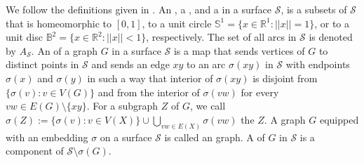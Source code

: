 We follow the definitions given in \citet[Appendix~B]{diestel:graph}. An , a , and a  in a surface $\mathcal{S}$, is a subsets of $\mathcal{S}$ that is homeomorphic to $[0, 1]$, to a unit circle $\mathbb{S}^1 = \{x \in \mathbb{R}^1: ||x|| = 1\}$, or to a unit disc $\mathbb{B}^2 = \{x \in \mathbb{R}^2 : ||x|| < 1\}$, respectively.
The set of all arcs in $\mathcal{S}$ is denoted by $A_\mathcal{S}$.
An  of a graph $G$ in a surface $\mathcal{S}$ is a map  that sends vertices of $G$ to distinct points in $\mathcal{S}$ and sends an edge $xy$ to
an arc $\sigma(xy)$ in $\mathcal{S}$ with endpoints $\sigma(x)$ and $\sigma(y)$ in such a way that interior of $\sigma(xy)$ is disjoint from $\{\sigma(v):v\in V(G)\}$ and from the interior of $\sigma(vw)$ for every $vw\in E(G)\setminus\{xy\}$.  For a subgraph $Z$ of $G$, we call $\sigma(Z):=\{\sigma(v):v\in V(X)\}\cup \bigcup_{vw\in E(X)}\sigma(vw)$ the  $Z$.
A graph $G$ equipped with an embedding $\sigma$ on a surface $\mathcal{S}$ is called an  graph. A  of $G$ in $\mathcal{S}$ is a component of $\mathcal{S} \setminus \sigma(G)$.


